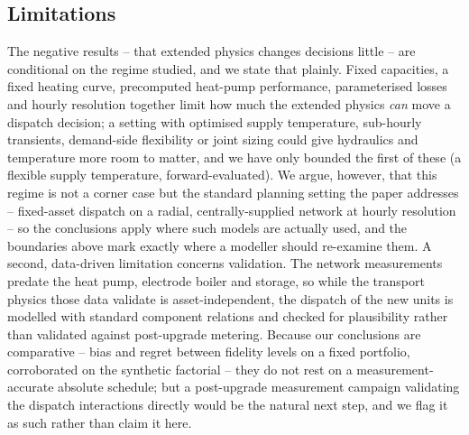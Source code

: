 \documentclass[a4paper,fleqn]{cas-dc}
\begin{document}
\subsection{Limitations}
The negative results -- that extended physics changes decisions little -- are conditional on
the regime studied, and we state that plainly. Fixed capacities, a fixed heating curve,
precomputed heat-pump performance, parameterised losses and hourly resolution together limit how
much the extended physics \emph{can} move a dispatch decision; a setting with optimised supply
temperature, sub-hourly transients, demand-side flexibility or joint sizing could give hydraulics
and temperature more room to matter, and we have only bounded the first of these (a flexible
supply temperature, forward-evaluated). We argue, however, that this regime is not a corner case
but the standard planning setting the paper addresses -- fixed-asset dispatch on a radial,
centrally-supplied network at hourly resolution -- so the conclusions apply where such models are
actually used, and the boundaries above mark exactly where a modeller should re-examine them.
A second, data-driven limitation concerns validation. The network measurements predate the heat
pump, electrode boiler and storage, so while the transport physics those data validate is
asset-independent, the dispatch of the new units is modelled with standard component relations
and checked for plausibility rather than validated against post-upgrade metering. Because our
conclusions are comparative -- bias and regret between fidelity levels on a fixed portfolio,
corroborated on the synthetic factorial -- they do not rest on a measurement-accurate absolute
schedule; but a post-upgrade measurement campaign validating the dispatch interactions directly
would be the natural next step, and we flag it as such rather than claim it here.


\end{document}
